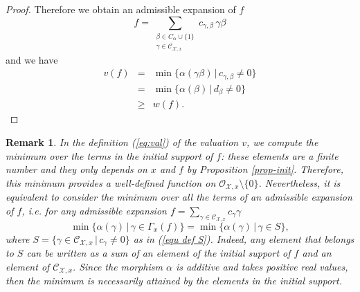 \documentclass{amsart}%
\numberwithin{equation}{subsection}
\theoremstyle{plain2}
\theoremstyle{definition2}
\newtheorem{rem}[equation]{Remark}
\theoremstyle{stepstyle}
\theoremstyle{point}
\theoremstyle{subpoint}
\newcommand{\cX}{\ensuremath{\mathscr{X}}}
\newcommand{\caC}{\ensuremath{\mathcal{C}}}
\newcommand{\caO}{\ensuremath{\mathcal{O}}}
\begin{document}
\begin{proof}
Therefore we obtain an admissible expansion of $f$ $$f = \sum_{\substack{\beta \in C_\alpha \cup \{1\} \\ \gamma \in \caC_{\cX,x}}}c_{\gamma, \beta}\, \gamma\beta $$ and we have  
\begin{eqnarray*}
v(f) 
& = & \min\{\alpha(\gamma \beta)\,|\,c_{\gamma, \beta}\neq 0\} \\
&=& \min\{\alpha(\beta)\,|\,d_{\beta}\neq 0\} \\
&\geq& w(f).
 \end{eqnarray*} \end{proof}
 
\begin{rem} \label{rem def-val}
In the definition (\ref{eq:val}) of the valuation $v$, we compute the minimum over the terms in the initial support of $f$: these elements are a finite number and they only depends on $x$ and $f$ by Proposition \ref{prop-init}. Therefore, this minimum provides a well-defined function on $\caO_{\cX,x} \setminus \{0\}$. Nevertheless, it is equivalent to consider the minimum over all the terms of an admissible expansion of $f$, i.e. for any admissible expansion $f=\sum_{\gamma \in \mathcal{C}_{\cX,x}}c_{\gamma}\gamma$ $$\min\{\alpha(\gamma)\,|\,\gamma\in \Gamma_x(f)\} = \min\{\alpha(\gamma)\,|\,\gamma\in S\},$$ where $S=\{\gamma\in\mathcal{C}_{\cX,x}\,|\,c_\gamma\neq 0\}$ as in (\ref{equ def S}). Indeed, any element that belongs to $S$ can be written as a sum of an element of the initial support of $f$ and an element of $\caC_{\cX,x}$. Since the morphism $\alpha$ is additive and takes positive real values, then the minimum is necessarily attained by the elements in the initial support.
\end{rem}
\end{document}

